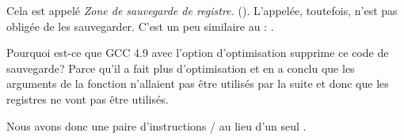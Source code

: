 Cela est appelé \emph{Zone de sauvegarde de registre.} (\ARMPCS).
L'appelée, toutefois, n'est pas obligée de les sauvegarder.
C'est un peu similaire au : .

Pourquoi est-ce que GCC 4.9 avec l'option d'optimisation supprime ce code de sauvegarde?
Parce qu'il a fait plus d'optimisation et en a conclu que les arguments de la fonction
n'allaient pas être utilisés par la suite et donc que les registres 
ne vont pas être utilisés.


Nous avons donc une paire d'instructions / au lieu d'un seul .

